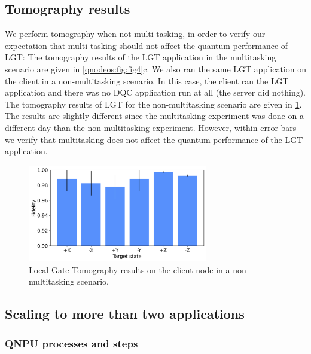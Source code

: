 \subsection{Tomography results}
\label{qnodeos:sec:multitasking-tomography}

We perform tomography when not multi-tasking, in order to verify our expectation that multi-tasking should not affect the quantum performance of \ac{LGT}: The tomography results of the \ac{LGT} application in the multitasking scenario are given in \cref{qnodeos:fig:fig4}c. We also ran the same \ac{LGT} application on the client in a non-multitasking scenario. In this case, the client ran the \ac{LGT} application and there was no \ac{DQC} application run at all (the server did nothing). The tomography results of \ac{LGT} for the non-multitasking scenario are given in \cref{qnodeos:fig:tomography-no-multitasking}. The results are slightly different since the multitasking experiment was done on a different day than the non-multitasking experiment. However, within error bars we verify that multitasking does not affect the quantum performance of the \ac{LGT} application.

\begin{figure}
\centering
\includegraphics[width=0.7\textwidth]{figures/qnodeos/supplementary/plots/noMT_gate_tomography.png}
\caption{Local Gate Tomography results on the client node in a non-multitasking scenario.}
\label{qnodeos:fig:tomography-no-multitasking}
\end{figure}

\subsection{Scaling to more than two applications}
\label{qnodeos:sec:multitasking-scaling}

\subsubsection{QNPU processes and steps}

